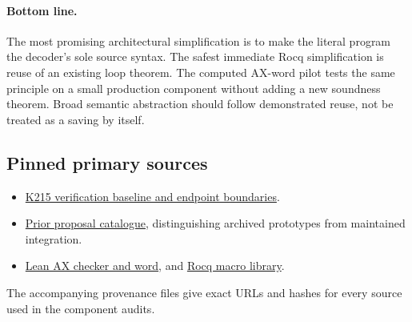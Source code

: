 \documentclass[11pt]{article}
\begin{document}
\paragraph{Bottom line.}
The most promising architectural simplification is to make the literal program the decoder's sole source syntax. The safest immediate Rocq simplification is reuse of an existing loop theorem. The computed AX-word pilot tests the same principle on a small production component without adding a new soundness theorem. Broad semantic abstraction should follow demonstrated reuse, not be treated as a saving by itself.

\subsection*{Pinned primary sources}
\begin{itemize}
\item \href{https://github.com/VladimirReshetnikov/ProveIt/blob/cbf94cb552a3b49509e0eee80e7455d4eb5974c6/Computability/BusyBeaver/Research/ZFC/k225-formal/verification/k215/README.md}{K215 verification baseline and endpoint boundaries}.
\item \href{https://github.com/VladimirReshetnikov/ProveIt/blob/cbf94cb552a3b49509e0eee80e7455d4eb5974c6/Computability/BusyBeaver/Research/ZFC/k225-formal/verification/k215/simplification/proposals/README.md}{Prior proposal catalogue}, distinguishing archived prototypes from maintained integration.
\item \href{https://github.com/VladimirReshetnikov/ProveIt/blob/cbf94cb552a3b49509e0eee80e7455d4eb5974c6/Computability/BusyBeaver/Lean/BusyBeaver/ZFC/L2AxiomsPerm.lean}{Lean AX checker and word}, and \href{https://github.com/VladimirReshetnikov/ProveIt/blob/cbf94cb552a3b49509e0eee80e7455d4eb5974c6/Computability/BusyBeaver/Research/ZFC/k225-formal/rocq/rocq-extension/coq/215/ProgLibPerm.v}{Rocq macro library}.
\end{itemize}
The accompanying provenance files give exact URLs and hashes for every source used in the component audits.
\end{document}
